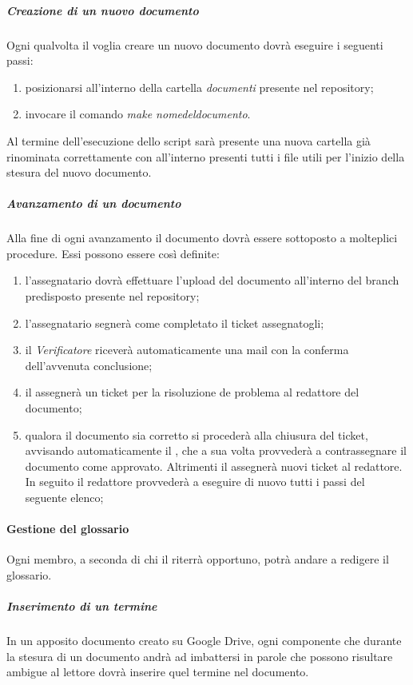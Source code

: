 				\subparagraph{Creazione di un nuovo documento}
				Ogni qualvolta il \roleProjectManager{} voglia creare un nuovo documento dovrà eseguire i seguenti passi:
				\begin{enumerate}
					\item posizionarsi all'interno della cartella \emph{documenti} presente nel repository;
					\item invocare il comando \emph{make nome\textunderscore del\textunderscore documento}.
				\end{enumerate}
				Al termine dell'esecuzione dello script sarà presente una nuova cartella già rinominata correttamente con all'interno presenti tutti i file utili per l'inizio della stesura del nuovo documento.

				\subparagraph{Avanzamento di un documento}
				Alla fine di ogni avanzamento il documento dovrà essere sottoposto a molteplici procedure. Essi possono essere così definite:
				\begin{enumerate}
					\item l'assegnatario dovrà effettuare l'upload del documento all'interno del branch predisposto presente nel repository;
					\item l'assegnatario segnerà come completato il ticket assegnatogli;
					\item il \emph{Verificatore} riceverà automaticamente una mail con la conferma dell'avvenuta conclusione;
					\item il \roleVerifier{} assegnerà un ticket per la risoluzione de problema al redattore del documento;
					\item qualora il documento sia corretto si procederà alla chiusura del ticket, avvisando automaticamente il \roleProjectManager{}, che a sua volta provvederà a contrassegnare il documento come approvato. Altrimenti il \roleVerifier{} assegnerà nuovi ticket al redattore. In seguito il redattore provvederà a eseguire di nuovo tutti i passi del seguente elenco;
				\end{enumerate}

			\paragraph{Gestione del glossario}
			Ogni membro, a seconda di chi il \roleProjectManager{} riterrà opportuno, potrà andare a redigere il glossario. \\
				\subparagraph{Inserimento di un termine}
				In un apposito documento creato su Google Drive, ogni componente che durante la stesura di un documento andrà ad imbattersi in parole che possono risultare ambigue al lettore dovrà inserire quel termine nel documento.
				

